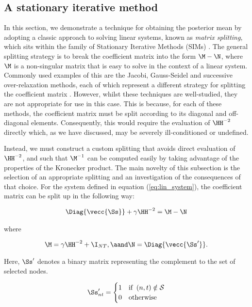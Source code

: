 \subsection{A stationary iterative method}

\label{sec:SIM}

In this section, we demonstrate a technique for obtaining the posterior mean by adopting a classic approach to solving linear systems, known as \textit{matrix splitting}, which sits within the family of Stationary Iterative Methods (SIMs) \citep{Saad2003}. The general splitting strategy is to break the coefficient matrix into the form $\M - \N$, where $\M$ is a non-singular matrix that is easy to solve in the context of a linear system. Commonly used examples of this are the Jacobi, Gauss-Seidel and successive over-relaxation methods, each of which represent a different strategy for splitting the coefficient matrix \citep{Saad2003}. However, whilst these techniques are well-studied, they are not appropriate for use in this case. This is because, for each of these methods, the coefficient matrix must be split according to its diagonal and off-diagonal elements. Consequently, this would require the evaluation of $\HH^{-2}$ directly which, as we have discussed, may be severely ill-conditioned or undefined.


Instead, we must construct a custom splitting that avoids direct evaluation of $\HH^{-2}$, and such that $\M^{-1}$ can be computed easily by taking advantage of the properties of the Kronecker product. The main novelty of this subsection is the selection of an appropriate splitting and an investigation of the consequences of that choice. For the system defined in equation (\ref{eq:lin_system}), the coefficient matrix can be split up in the following way:

\begin{equation}
    \Diag{\vecc{\Ss}} + \gamma  \HH^{-2} =  \M - \N
\end{equation}

\noindent where 

\begin{equation}
    \M = \gamma \HH^{-2} + \I_{NT}, \aand \N = \Diag{\vecc{\Ss'}}.
\end{equation}

 Here, $\Ss'$ denotes a binary matrix representing the complement to the set of selected nodes.
 
 \begin{equation}
    \Ss'_{nt} = \begin{cases}
        1 & \text{if} \;\; (n, t) \notin \mathcal{S} \\
        0 & \text{otherwise}
    \end{cases}
\end{equation}
 
